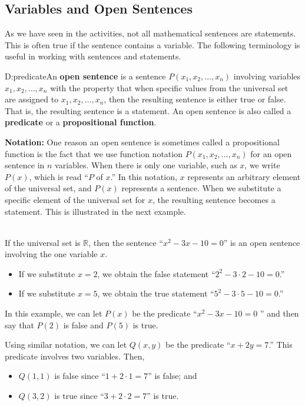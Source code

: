 \subsection*{Variables and Open Sentences}
As we have seen in the \typel activities, not all mathematical sentences are statements.  This is often true if the sentence contains a variable.  The following terminology is useful in working with sentences and statements.
%
\begin{defbox}{D:predicate}{An \textbf{open sentence}  
%
 is a sentence  $P( {x_1 ,x_2 , \ldots ,x_n })$ involving variables $x_1 ,x_2 , \ldots ,x_n $ with the property that when specific values from the universal set are assigned to $x_1 ,x_2 , \ldots ,x_n $, then the resulting sentence is either true or false.  That is, the resulting sentence is a statement.  An open sentence is also called a \textbf{predicate}
%
 or a \textbf{propositional function}.}
%
\end{defbox}
%
\noindent
\textbf{Notation:}  One reason an open sentence is sometimes called a propositional function is the fact that we use function notation $P( {x_1 ,x_2 , \ldots ,x_n })$ for an open sentence in  $n$  variables.  When there is only one variable, such as  $x$, we write  $P( x )$, which is read ``$P$ of  $x$.''  In this notation,  $x$  represents  an arbitrary element of the universal set, and  $P(x)$ represents a sentence.   When we substitute a specific element of the universal set for  $x$, the resulting sentence becomes a statement.  This is illustrated in the next example. 
%
\begin{example} \label{E:exam21} \hfill \\
If the universal set is  $\mathbb{R}$, then  the sentence  ``$x^2  - 3x - 10 = 0$'' is an open sentence involving the one variable  $x$.  
\begin{itemize}
  \item If we substitute  $x = 2$, we obtain the false statement 
``$2^2  - 3 \cdot 2 - 10 = 0$.''

  \item If we substitute  $x = 5$, we obtain the true statement  
``$5^2  - 3 \cdot 5 - 10 = 0$.''

\end{itemize}
In this example, we can let  $P( x )$ be the predicate ``$x^2  - 3x - 10 = 0$
'' and then say that  $P( 2 )$ is false and $P( 5 )$ is true.

Using similar notation, we can let  $Q( {x, y} )$ be the predicate  ``$x + 2y = 7$.''  This predicate involves two variables.  Then,

\begin{itemize}
\item $Q( {1, 1})$ is false since  ``$1 + 2 \cdot 1 = 7$'' is false; and  

\item $Q( {3, 2} )$ is true since  ``$3 + 2 \cdot 2 = 7$'' is true.
\end{itemize}
\end{example}
